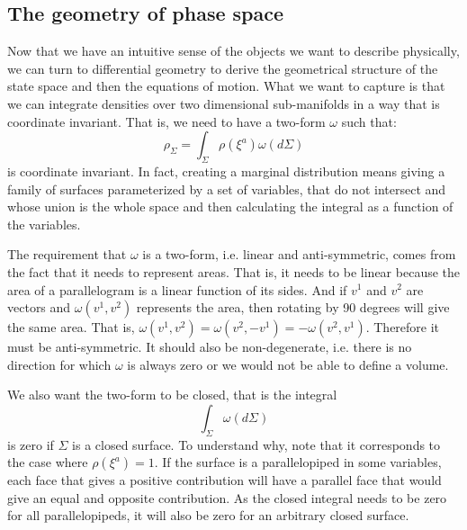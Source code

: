 \documentclass[11pt]{article}
\begin{document}
\subsection*{The geometry of phase space}

Now that we have an intuitive sense of the objects we want to describe physically, we can turn to differential geometry to derive the geometrical structure of the state space and then the equations of motion. What we want to capture is that we can integrate densities over two dimensional sub-manifolds in a way that is coordinate invariant. That is, we need to have a two-form $\omega$ such that:
\begin{equation}
\rho_\Sigma = \int_\Sigma \rho(\xi^a) \omega(d\Sigma)
\end{equation}
is coordinate invariant. In fact, creating a marginal distribution means giving a family of surfaces parameterized by a set of variables, that do not intersect and whose union is the whole space and then calculating the integral as a function of the variables.

The requirement that $\omega$ is a two-form, i.e. linear and anti-symmetric, comes from the fact that it needs to represent areas. That is, it needs to be linear because the area of a parallelogram is a linear function of its sides. And if $v^1$ and $v^2$ are vectors and $\omega(v^1, v^2)$ represents the area, then rotating by 90 degrees will give the same area. That is, $\omega(v^1, v^2) = \omega(v^2, -v^1) = -\omega(v^2, v^1)$. Therefore it must be anti-symmetric. It should also be non-degenerate, i.e. there is no direction for which $\omega$ is always zero or we would not be able to define a volume.

We also want the two-form to be closed, that is the integral
\begin{equation}
\int_\Sigma \omega(d\Sigma)
\end{equation}
is zero if $\Sigma$ is a closed surface. To understand why, note that it corresponds to the case where $\rho(\xi^a)=1$. If the surface is a parallelopiped in some variables, each face that gives a positive contribution will have a parallel face that would give an equal and opposite contribution. As the closed integral needs to be zero for all parallelopipeds, it will also be zero for an arbitrary closed surface.
\end{document}
